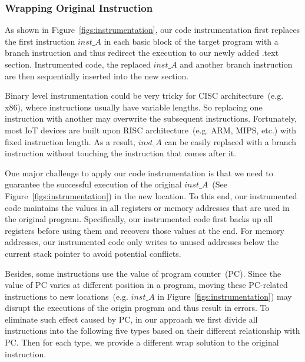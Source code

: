 \subsubsection{\bf{Wrapping Original Instruction}}\label{sec:design:wrap}

As shown in Figure~\ref{figs:instrumentation}, our code instrumentation first replaces the first instruction $inst\_A$ in each basic block of the target program with a branch instruction and thus redirect the execution to our newly added .text section. Instrumented code, the replaced $inst\_A$ and another branch instruction are then sequentially inserted into the new section.

Binary level instrumentation could be very tricky for CISC architecture~(e.g. x86), where instructions usually have variable lengths. So replacing one instruction with another may overwrite the subsequent instructions. Fortunately, most IoT devices are built upon RISC architecture~(e.g. ARM, MIPS, etc.) with fixed instruction length. As a result, $inst\_A$ can be easily replaced with a branch instruction without touching the instruction that comes after it. 

One major challenge to apply our code instrumentation is that we need to guarantee the successful execution of the original $inst\_A$~(See Figure~\ref{figs:instrumentation}) in the new location. To this end, our instrumented code maintains the values in all registers or memory addresses that are used in the original program. Specifically, our instrumented code first backs up all registers before using them and recovers those values at the end. For memory addresses, our instrumented code only writes to unused addresses below the current stack pointer to avoid potential conflicts. 

Besides, some instructions use the value of program counter~(PC). Since the value of PC varies at different position in a program, moving these PC-related instructions to new locations~(e.g. $inst\_A$ in Figure~\ref{figs:instrumentation}) may disrupt the executions of the origin program and thus result in errors. To eliminate such effect caused by PC, in our approach we first divide all instructions into the following five types based on their different relationship with PC. Then for each type, we provide a different wrap solution to the original instruction.

